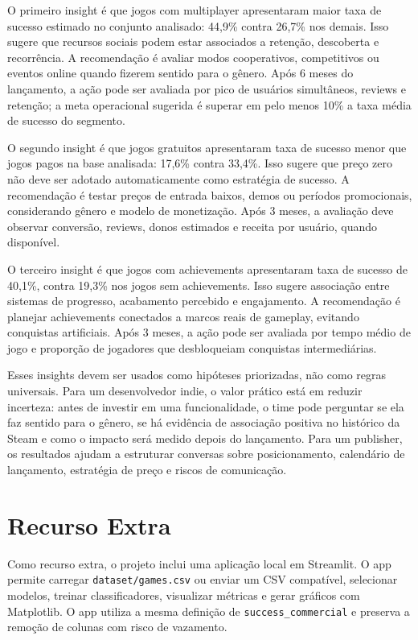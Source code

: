 \documentclass[12pt]{article}
\begin{document}
O primeiro insight é que jogos com multiplayer apresentaram maior taxa de sucesso estimado no conjunto analisado: 44,9\% contra 26,7\% nos demais. Isso sugere que recursos sociais podem estar associados a retenção, descoberta e recorrência. A recomendação é avaliar modos cooperativos, competitivos ou eventos online quando fizerem sentido para o gênero. Após 6 meses do lançamento, a ação pode ser avaliada por pico de usuários simultâneos, reviews e retenção; a meta operacional sugerida é superar em pelo menos 10\% a taxa média de sucesso do segmento.

O segundo insight é que jogos gratuitos apresentaram taxa de sucesso menor que jogos pagos na base analisada: 17,6\% contra 33,4\%. Isso sugere que preço zero não deve ser adotado automaticamente como estratégia de sucesso. A recomendação é testar preços de entrada baixos, demos ou períodos promocionais, considerando gênero e modelo de monetização. Após 3 meses, a avaliação deve observar conversão, reviews, donos estimados e receita por usuário, quando disponível.

O terceiro insight é que jogos com achievements apresentaram taxa de sucesso de 40,1\%, contra 19,3\% nos jogos sem achievements. Isso sugere associação entre sistemas de progresso, acabamento percebido e engajamento. A recomendação é planejar achievements conectados a marcos reais de gameplay, evitando conquistas artificiais. Após 3 meses, a ação pode ser avaliada por tempo médio de jogo e proporção de jogadores que desbloqueiam conquistas intermediárias.

Esses insights devem ser usados como hipóteses priorizadas, não como regras universais. Para um desenvolvedor indie, o valor prático está em reduzir incerteza: antes de investir em uma funcionalidade, o time pode perguntar se ela faz sentido para o gênero, se há evidência de associação positiva no histórico da Steam e como o impacto será medido depois do lançamento. Para um publisher, os resultados ajudam a estruturar conversas sobre posicionamento, calendário de lançamento, estratégia de preço e riscos de comunicação.

\section{Recurso Extra}

Como recurso extra, o projeto inclui uma aplicação local em Streamlit. O app permite carregar \texttt{dataset/games.csv} ou enviar um CSV compatível, selecionar modelos, treinar classificadores, visualizar métricas e gerar gráficos com Matplotlib. O app utiliza a mesma definição de \texttt{success\_commercial} e preserva a remoção de colunas com risco de vazamento.
\end{document}
